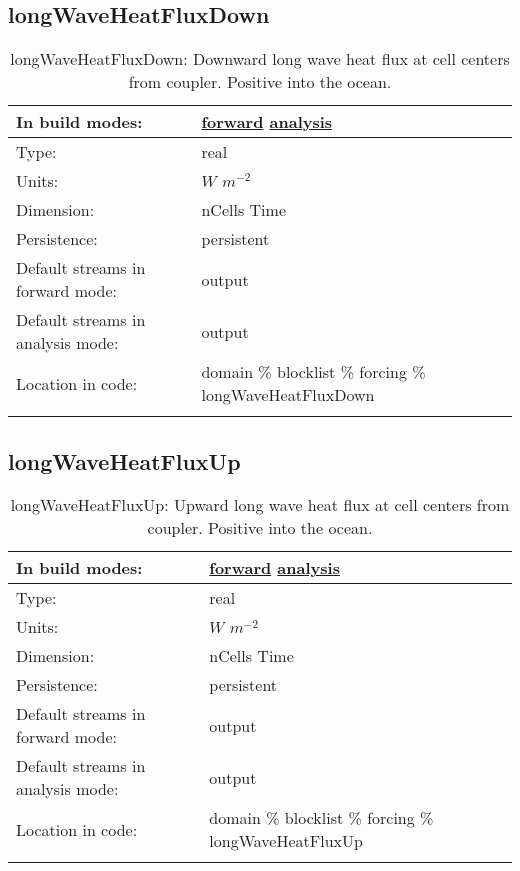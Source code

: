 \subsection[longWaveHeatFluxDown]{longWaveHeatFluxDown}
\label{subsec:var_sec_forcing_longWaveHeatFluxDown}
\begin{center}
\begin{longtable}{| p{2.0in} | p{4.0in} |}
        \hline 
        In build modes: & \hyperref[subsec:forward_var_tab_forcing]{forward} \hyperref[subsec:analysis_var_tab_forcing]{analysis} \\
        \hline 
        Type: & real \\
        \hline 
        Units: & $W$ $m^{-2}$ \\
        \hline 
        Dimension: & nCells Time \\
        \hline 
        Persistence: & persistent \\
        \hline 
		 Default streams in forward mode: &  output \\
        \hline 
		 Default streams in analysis mode: &  output \\
        \hline 
		 Location in code: & domain \% blocklist \% forcing \% longWaveHeatFluxDown \\
		 \hline 
    \caption{longWaveHeatFluxDown: Downward long wave heat flux at cell centers from coupler. Positive into the ocean.}
\end{longtable}
\end{center}
\subsection[longWaveHeatFluxUp]{longWaveHeatFluxUp}
\label{subsec:var_sec_forcing_longWaveHeatFluxUp}
\begin{center}
\begin{longtable}{| p{2.0in} | p{4.0in} |}
        \hline 
        In build modes: & \hyperref[subsec:forward_var_tab_forcing]{forward} \hyperref[subsec:analysis_var_tab_forcing]{analysis} \\
        \hline 
        Type: & real \\
        \hline 
        Units: & $W$ $m^{-2}$ \\
        \hline 
        Dimension: & nCells Time \\
        \hline 
        Persistence: & persistent \\
        \hline 
		 Default streams in forward mode: &  output \\
        \hline 
		 Default streams in analysis mode: &  output \\
        \hline 
		 Location in code: & domain \% blocklist \% forcing \% longWaveHeatFluxUp \\
		 \hline 
    \caption{longWaveHeatFluxUp: Upward long wave heat flux at cell centers from coupler. Positive into the ocean.}
\end{longtable}
\end{center}
